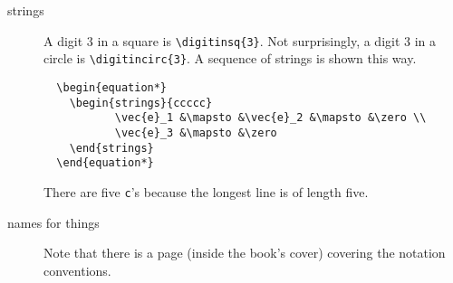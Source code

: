\documentclass[titlepage]{article}
\begin{document}
\begin{description}
\item[strings]
  A digit $3$ in a square is \verb!\digitinsq{3}!.
  Not surprisingly, a digit $3$ in a circle is \verb!\digitincirc{3}!.
  A sequence of strings is shown this way.
\begin{verbatim}
  \begin{equation*}
    \begin{strings}{ccccc}
           \vec{e}_1 &\mapsto &\vec{e}_2 &\mapsto &\zero \\
           \vec{e}_3 &\mapsto &\zero
    \end{strings}
  \end{equation*}
\end{verbatim}
  There are five \verb!c!'s because the longest line
  is of length five.

\item[names for things]
  Note that there is a page (inside the book's cover) 
  covering the notation conventions.


\end{description}
\end{document}
